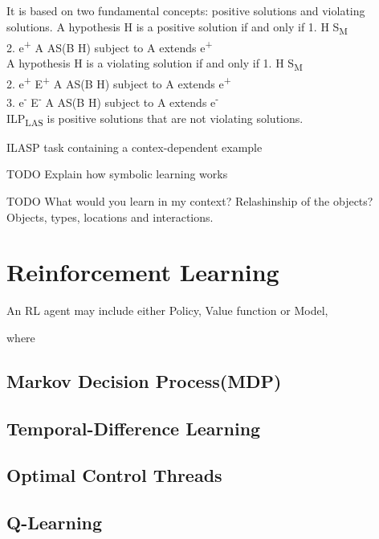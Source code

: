 \documentclass[12pt,twoside]{report}
\begin{document}
It is based on two fundamental concepts: positive solutions and violating solutions.
A hypothesis H is a positive solution if and only if
1. H \subseteq S\textsubscript{M} \\
2. \forall e\textsuperscript{+} \in \exists A \in AS(B \cup H) subject to A extends e\textsuperscript{+}\\

A hypothesis H is a violating solution if and only if
1. H \subseteq S\textsubscript{M} \\
2. \forall e\textsuperscript{+} \in E\textsuperscript{+} \exists A \in AS(B \cup H) subject to A extends e\textsuperscript{+}\\
3. \exists e\textsuperscript{-} \in E\textsuperscript{-} \exists A \in AS(B \cup H) subject to A extends e\textsuperscript{-}\\


ILP\textsubscript{LAS} is positive solutions that are not violating solutions.

ILASP task containing a contex-dependent example

TODO Explain how symbolic learning works

TODO What would you learn in my context? Relashinship of the objects?
Objects, types, locations and interactions.

\section{Reinforcement Learning}
An RL agent may include either Policy, Value function or Model,

where

\subsection{Markov Decision Process(MDP)}

\subsection{Temporal-Difference Learning}

\subsection{Optimal Control Threads}

\subsection{Q-Learning}
\end{document}
